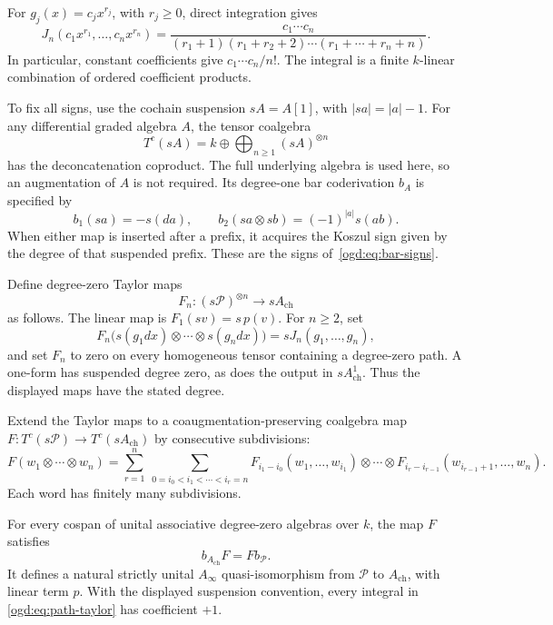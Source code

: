 For \(g_j(x)=c_jx^{r_j}\), with \(r_j\geq0\), direct integration gives
\begin{equation}\label{ogd:eq:path-monomial-integral}
 J_n(c_1x^{r_1},\ldots,c_nx^{r_n})
 =
 \frac{c_1\cdots c_n}
 {(r_1+1)(r_1+r_2+2)\cdots(r_1+\cdots+r_n+n)}.
\end{equation}
In particular, constant coefficients give \(c_1\cdots c_n/n!\).
The integral is a finite \(k\)-linear combination of ordered coefficient
products.

To fix all signs, use the cochain suspension \(sA=A[1]\), with
\(|sa|=|a|-1\).
For any differential graded algebra \(A\), the tensor coalgebra
\[
 T^c(sA)=k\oplus\bigoplus_{n\geq1}(sA)^{\otimes n}
\]
has the deconcatenation coproduct.
The full underlying algebra is used here, so an augmentation of \(A\)
is not required.
Its degree-one bar coderivation \(b_A\) is specified by
\[
 b_1(sa)=-s(da),\qquad
 b_2(sa\otimes sb)=(-1)^{|a|}s(ab).
\]
When either map is inserted after a prefix, it acquires the Koszul sign
given by the degree of that suspended prefix.
These are the signs of~\eqref{ogd:eq:bar-signs}.

Define\label{ogd:def:path-taylor-maps} degree-zero Taylor maps
\[
 F_n:(s\mathcal P)^{\otimes n}\longrightarrow sA_{\mathrm{ch}}
\]
as follows.
The linear map is \(F_1(sv)=s\,p(v)\).
For \(n\geq2\), set
\begin{equation}\label{ogd:eq:path-taylor}
 F_n\bigl(s(g_1dx)\otimes\cdots\otimes s(g_ndx)\bigr)
   =sJ_n(g_1,\ldots,g_n),
\end{equation}
and set \(F_n\) to zero on every homogeneous tensor containing a
degree-zero path.
A one-form has suspended degree zero, as does the output in
\(sA_{\mathrm{ch}}^1\).
Thus the displayed maps have the stated degree.

Extend the Taylor maps to a coaugmentation-preserving coalgebra map
\(F:T^c(s\mathcal P)\to T^c(sA_{\mathrm{ch}})\) by consecutive subdivisions:
\[
 F(w_1\otimes\cdots\otimes w_n)
 =
 \sum_{r=1}^n\ \sum_{0=i_0<i_1<\cdots<i_r=n}
 F_{i_1-i_0}(w_1,\ldots,w_{i_1})\otimes\cdots\otimes
 F_{i_r-i_{r-1}}(w_{i_{r-1}+1},\ldots,w_n).
\]
Each word has finitely many subdivisions.

\begin{theorem}\label{ogd:thm:path-chamber}
For every cospan of unital associative degree-zero algebras over \(k\),
the map \(F\) satisfies
\[
 b_{A_{\mathrm{ch}}}F=F b_{\mathcal P}.
\]
It defines a natural strictly unital \(A_\infty\) quasi-isomorphism from
\(\mathcal P\) to \(A_{\mathrm{ch}}\), with linear term \(p\).
With the displayed suspension convention, every integral in
\eqref{ogd:eq:path-taylor} has coefficient \(+1\).
\end{theorem}

